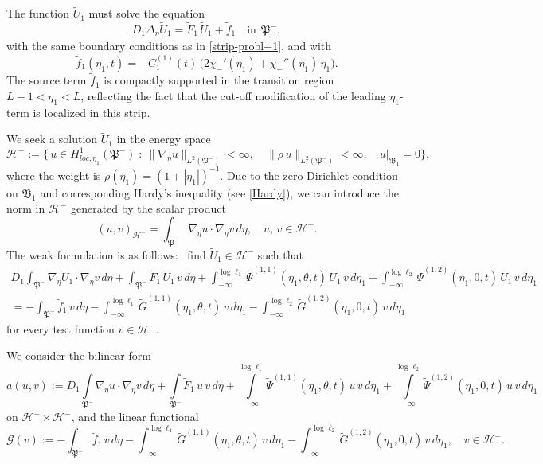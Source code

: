 \documentclass[reqno]{amsart}            %
\numberwithin{equation}{section}
\begin{document}
	The function $\widetilde{U}_1$ must solve the equation
	$$
	D_1\Delta_\eta \widetilde{U}_1 = \widetilde{F}_1 \, \widetilde{U}_1 + \tilde{f}_1 \quad \text{in} \ \ \mathfrak{P}^-,
	$$ 
	with the same boundary conditions as in \eqref{strip-probl+1}, and with
	\begin{equation}\label{func-f_1}
		\tilde{f}_1(\eta_1,t) = -C_1^{(1)}(t)\, \big(2\chi_-'(\eta_1) + \chi_-''(\eta_1)\,\eta_1\big).
	\end{equation}
	The source term $\tilde{f}_1$ is compactly supported in the transition region
	$L-1 < \eta_1 < L$, reflecting the fact that the cut-off modification of the
	leading $\eta_1$-term is localized in this strip.
	
	
	We seek a solution $\widetilde{U}_1$ in the energy space
	$$
	\mathcal{H}^- := \big\{\, 
	u \in H^1_{loc,\eta_1}(\mathfrak{P}^-) \; \colon \ 
	\|\nabla_{\eta} u\|_{L^2(\mathfrak{P}^-)} < \infty,\quad  
	\|\rho\, u\|_{L^2(\mathfrak{P}^-)} < \infty, \quad u|_{\mathfrak{B}_1}=0
	\big\},
	$$ 
	where the weight is $\rho(\eta_1)=(1+ |\eta_1|)^{-1}.$ Due to the zero Dirichlet condition on $\mathfrak{B}_1$ and corresponding Hardy’s inequality (see \eqref{Hardy}), we can introduce the norm in $\mathcal{H}^-$ generated by the scalar product
	$$
	(u, v)_{\mathcal{H}^-}
	=  \int_{\mathfrak{P}^-}\nabla_\eta u \cdot \nabla_\eta v \, d\eta, \quad  u, \, v \in \mathcal{H}^- .
	$$ 
	The weak formulation is as follows:  \  find  $\widetilde{U}_1 \in \mathcal{H}^-$ such that
	\begin{multline}\label{int-iden-1}
		D_1 \int_{\mathfrak{P}^-} \nabla_\eta\widetilde{U}_1\cdot\nabla_{\eta} v \, d\eta + \int_{\mathfrak{P}^-} \widetilde{F}_1 \, \widetilde{U}_1 \, v \, d\eta + \int_{-\infty}^{\log\ell_1} \widetilde{\Psi}^{(1,1)}(\eta_1,\theta,t) \, \widetilde{U}_1 \, v \, d\eta_1 + 
		\int_{-\infty}^{\log\ell_2} \widetilde{\Psi}^{(1,2)}(\eta_1,0,t) \, \widetilde{U}_1 \, v \, d\eta_1
		\\
		= - \int_{\mathfrak{P}^-}  \tilde{f}_1 \, v \, d\eta - 	
		\int_{-\infty}^{\log\ell_1} \widetilde{G}^{(1,1)}(\eta_1,\theta,t) \,  v \, d\eta_1 - 
		\int_{-\infty}^{\log\ell_2} \widetilde{G}^{(1,2)}(\eta_1,0,t) \,  v \, d\eta_1
	\end{multline}  
	for every test function $v\in \mathcal{H}^-.$
	
	
	We consider the bilinear form
	\[
	a(u, v) :=
	D_1 \int\limits_{\mathfrak{P}^-} \nabla_\eta u \cdot\nabla_{\eta} v \, d\eta + \int\limits_{\mathfrak{P}^-} \widetilde{F}_1 \, u \, v \, d\eta + \int\limits_{-\infty}^{\log\ell_1} \widetilde{\Psi}^{(1,1)}(\eta_1,\theta,t) \, u \, v \, d\eta_1 + 
	\int\limits_{-\infty}^{\log\ell_2} \widetilde{\Psi}^{(1,2)}(\eta_1,0,t) \, u \, v \, d\eta_1
	\]
	on $\mathcal{H}^- \times \mathcal{H}^-$, and the linear functional
	$$
	\mathcal{G}(v) := - \int_{\mathfrak{P}^-}  \tilde{f}_1 \, v \, d\eta - 	
	\int_{-\infty}^{\log\ell_1} \widetilde{G}^{(1,1)}(\eta_1,\theta,t) \,  v \, d\eta_1 - 
	\int_{-\infty}^{\log\ell_2} \widetilde{G}^{(1,2)}(\eta_1,0,t) \,  v \, d\eta_1, \quad v \in \mathcal{H}^-. 
	$$
	
\end{document}
